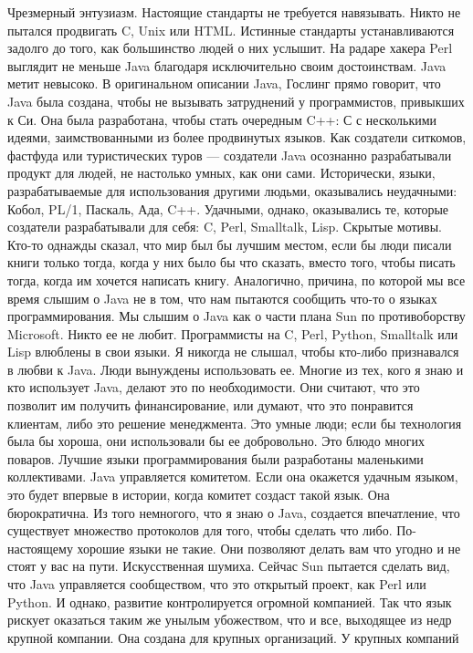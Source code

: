\documentclass[ebook,12pt,oneside,openany]{memoir}
\begin{document}
Чрезмерный энтузиазм. Настоящие стандарты не требуется навязывать.
Никто не пытался продвигать C, Unix или HTML. Истинные стандарты
устанавливаются задолго до того, как большинство людей о них услышит.
На радаре хакера Perl выглядит не меньше Java благодаря исключительно
своим достоинствам. Java метит невысоко. В оригинальном описании Java,
Гослинг прямо говорит, что Java была создана, чтобы не вызывать
затруднений у программистов, привыкших к Си. Она была разработана,
чтобы стать очередным C++: С с несколькими идеями, заимствованными из
более продвинутых языков. Как создатели ситкомов, фастфуда или
туристических туров — создатели Java осознанно разрабатывали продукт
для людей, не настолько умных, как они сами. Исторически, языки,
разрабатываемые для использования другими людьми, оказывались
неудачными: Кобол, PL/1, Паскаль, Ада, C++. Удачными, однако,
оказывались те, которые создатели разрабатывали для себя: C, Perl,
Smalltalk, Lisp. Скрытые мотивы. Кто-то однажды сказал, что мир был бы
лучшим местом, если бы люди писали книги только тогда, когда у них
было бы что сказать, вместо того, чтобы писать тогда, когда им хочется
написать книгу. Аналогично, причина, по которой мы все время слышим о
Java не в том, что нам пытаются сообщить что-то о языках
программирования. Мы слышим о Java как о части плана Sun по
противоборству Microsoft. Никто ее не любит. Программисты на C, Perl,
Python, Smalltalk или Lisp влюблены в свои языки. Я никогда не слышал,
чтобы кто-либо признавался в любви к Java. Люди вынуждены использовать
ее. Многие из тех, кого я знаю и кто использует Java, делают это по
необходимости. Они считают, что это позволит им получить
финансирование, или думают, что это понравится клиентам, либо это
решение менеджмента. Это умные люди; если бы технология была бы
хороша, они использовали бы ее добровольно. Это блюдо многих поваров.
Лучшие языки программирования были разработаны маленькими
коллективами. Java управляется комитетом. Если она окажется удачным
языком, это будет впервые в истории, когда комитет создаст такой язык.
Она бюрократична. Из того немногого, что я знаю о Java, создается
впечатление, что существует множество протоколов для того, чтобы
сделать что либо. По-настоящему хорошие языки не такие. Они позволяют
делать вам что угодно и не стоят у вас на пути. Искусственная шумиха.
Сейчас Sun пытается сделать вид, что Java управляется сообществом, что
это открытый проект, как Perl или Python. И однако, развитие
контролируется огромной компанией. Так что язык рискует оказаться
таким же унылым убожеством, что и все, выходящее из недр крупной
компании. Она создана для крупных организаций. У крупных компаний
\end{document}
